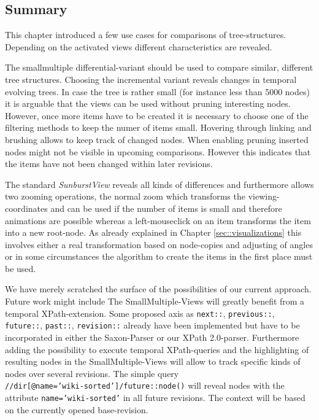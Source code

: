 \subsection{Summary}
This chapter introduced a few use cases for comparisons of tree-structures. Depending on the activated views different characteristics are revealed. 

The smallmultiple differential-variant should be used to compare similar, different tree structures. Choosing the incremental variant reveals changes in temporal evolving trees. In case the tree is rather small (for instance less than 5000 nodes) it is arguable that the views can be used without pruning interesting nodes. However, once more items have to be created it is necessary to choose one of the filtering methods to keep the numer of items small. Hovering through linking and brushing allows to keep track of changed nodes. When enabling pruning inserted nodes might not be visible in upcoming comparisons. However this indicates that the items have not been changed within later revisions. 

The standard \emph{SunburstView} reveals all kinds of differences and furthermore allows two zooming operations, the normal zoom which transforms the viewing-coordinates and can be used if the number of items is small and therefore animations are possible whereas a left-mouseclick on an item transforms the item into a new root-node. As already explained in Chapter \ref{sec::visualizations} this involves either a real transformation based on node-copies and adjusting of angles or in some circumstances the algorithm to create the items in the first place must be used.

We have merely scratched the surface of the possibilities of our current approach. Future work might include  The SmallMultiple-Views will greatly benefit from a temporal XPath-extension. Some proposed axis as \texttt{next::}, \texttt{previous::}, \texttt{future::}, \texttt{past::}, \texttt{revision::} already have been implemented but have to be incorporated in either the Saxon-Parser or our XPath 2.0-parser. Furthermore adding the possibility to execute temporal XPath-queries and the highlighting of resulting nodes in the SmallMultiple-Views will allow to track specific kinds of nodes over several revisions. The simple query \\\texttt{//dir[@name='wiki-sorted']/future::node()} will reveal nodes with the attribute \texttt{name='wiki-sorted'} in all future revisions. The context will be based on the currently opened base-revision. 








